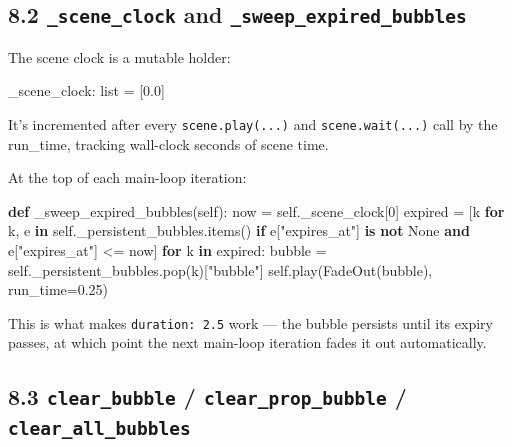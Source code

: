 \documentclass[
  12pt,
  letterpaper,
]{book}
\newenvironment{Shaded}{}{}
\newcommand{\BuiltInTok}[1]{\textcolor[rgb]{0.00,0.50,0.00}{#1}}
\newcommand{\ControlFlowTok}[1]{\textcolor[rgb]{0.00,0.44,0.13}{\textbf{#1}}}
\newcommand{\DecValTok}[1]{\textcolor[rgb]{0.25,0.63,0.44}{#1}}
\newcommand{\FloatTok}[1]{\textcolor[rgb]{0.25,0.63,0.44}{#1}}
\newcommand{\KeywordTok}[1]{\textcolor[rgb]{0.00,0.44,0.13}{\textbf{#1}}}
\newcommand{\NormalTok}[1]{#1}
\newcommand{\OperatorTok}[1]{\textcolor[rgb]{0.40,0.40,0.40}{#1}}
\newcommand{\StringTok}[1]{\textcolor[rgb]{0.25,0.44,0.63}{#1}}
\newcommand{\VariableTok}[1]{\textcolor[rgb]{0.10,0.09,0.49}{#1}}
\begin{document}
\subsection{\texorpdfstring{8.2 \texttt{\_scene\_clock} and
\texttt{\_sweep\_expired\_bubbles}}{8.2 \_scene\_clock and \_sweep\_expired\_bubbles}}\label{scene_clock-and-_sweep_expired_bubbles}

The scene clock is a mutable holder:

\begin{Shaded}
\begin{Highlighting}[]
\NormalTok{\_scene\_clock: }\BuiltInTok{list} \OperatorTok{=}\NormalTok{ [}\FloatTok{0.0}\NormalTok{]}
\end{Highlighting}
\end{Shaded}

It's incremented after every \texttt{scene.play(...)} and
\texttt{scene.wait(...)} call by the run\_time, tracking wall-clock
seconds of scene time.

At the top of each main-loop iteration:

\begin{Shaded}
\begin{Highlighting}[]
\KeywordTok{def}\NormalTok{ \_sweep\_expired\_bubbles(}\VariableTok{self}\NormalTok{):}
\NormalTok{    now }\OperatorTok{=} \VariableTok{self}\NormalTok{.\_scene\_clock[}\DecValTok{0}\NormalTok{]}
\NormalTok{    expired }\OperatorTok{=}\NormalTok{ [k }\ControlFlowTok{for}\NormalTok{ k, e }\KeywordTok{in} \VariableTok{self}\NormalTok{.\_persistent\_bubbles.items()}
               \ControlFlowTok{if}\NormalTok{ e[}\StringTok{"expires\_at"}\NormalTok{] }\KeywordTok{is} \KeywordTok{not} \VariableTok{None} \KeywordTok{and}\NormalTok{ e[}\StringTok{"expires\_at"}\NormalTok{] }\OperatorTok{\textless{}=}\NormalTok{ now]}
    \ControlFlowTok{for}\NormalTok{ k }\KeywordTok{in}\NormalTok{ expired:}
\NormalTok{        bubble }\OperatorTok{=} \VariableTok{self}\NormalTok{.\_persistent\_bubbles.pop(k)[}\StringTok{"bubble"}\NormalTok{]}
        \VariableTok{self}\NormalTok{.play(FadeOut(bubble), run\_time}\OperatorTok{=}\FloatTok{0.25}\NormalTok{)}
\end{Highlighting}
\end{Shaded}

This is what makes \texttt{duration:\ 2.5} work --- the bubble persists
until its expiry passes, at which point the next main-loop iteration
fades it out automatically.

\subsection{\texorpdfstring{8.3 \texttt{clear\_bubble} /
\texttt{clear\_prop\_bubble} /
\texttt{clear\_all\_bubbles}}{8.3 clear\_bubble / clear\_prop\_bubble / clear\_all\_bubbles}}\label{clear_bubble-clear_prop_bubble-clear_all_bubbles}
\end{document}
